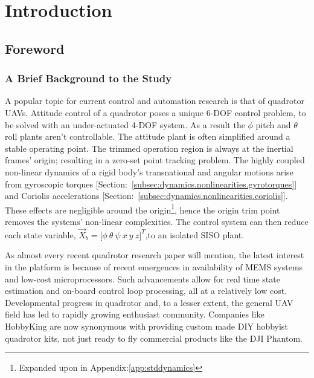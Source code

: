 \chapter{Introduction}
\label{ch:intro}
\section{Foreword}
\label{sec:intro.foreword}
\subsection{A Brief Background to the Study}
\label{subsec:intro.foreword.background}
A popular topic for current control and automation research is that of quadrotor UAVs. Attitude control of a quadrotor poses a unique 6-DOF control problem, to be solved with an under-actuated 4-DOF system. As a result the $\phi$ pitch and $\theta$ roll plants aren't controllable. The attitude plant is often simplified around a stable operating point. The trimmed operation region is always at the inertial frames' origin; resulting in a zero-set point tracking problem. The highly coupled non-linear dynamics of a rigid body's transnational and angular motions arise from gyroscopic torques [Section:~\ref{subsec:dynamics.nonlinearities.gyrotorques}] and Coriolis accelerations [Section:~\ref{subsec:dynamics.nonlinearities.coriolis}]. These effects are negligible around the origin\footnote{Expanded upon in Appendix:\ref{app:stddynamics}}, hence the origin trim point removes the systems' non-linear complexities. The control system can then reduce each state variable, $\vec{X}_b=\big[\phi~\theta~\psi~x~y~z\big]^T$,to an isolated SISO plant.
\par
As almost every recent quadrotor research paper will mention, the latest interest in the platform is because of recent emergences in availability of MEMS systems and low-cost microprocessors. Such advancements allow for real time state estimation and on-board control loop processing, all at a relatively low cost. Developmental progress in quadrotor and, to a lesser extent, the general UAV field has led to rapidly growing enthusiast community. Companies like HobbyKing\cite{hobbyking} are now synonymous with providing custom made DIY hobbyist quadrotor kits, not just ready to fly commercial products like the DJI Phantom\cite{phantom}.
